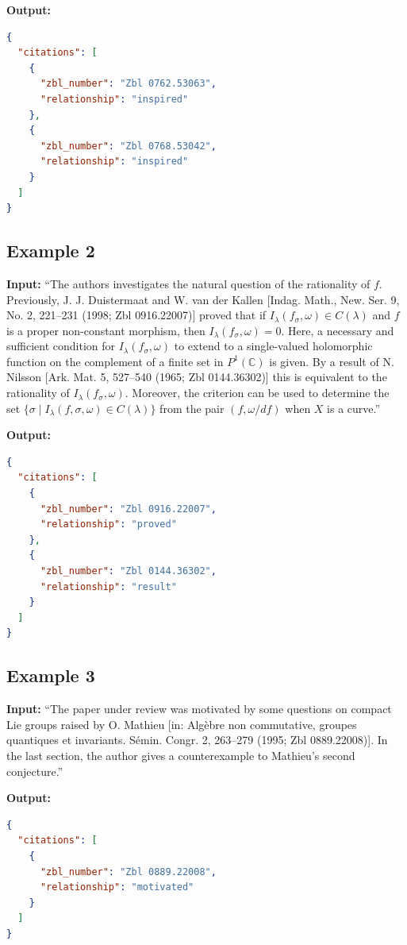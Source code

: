 \documentclass[sigconf,anonymous]{acmart}
\begin{document}
\textbf{Output:}
\begin{lstlisting}[language=json]
{
  "citations": [
    {
      "zbl_number": "Zbl 0762.53063",
      "relationship": "inspired"
    },
    {
      "zbl_number": "Zbl 0768.53042",
      "relationship": "inspired"
    }
  ]
}
\end{lstlisting}

\subsection*{Example 2}

\textbf{Input:} ``The authors investigates the natural question of the rationality of $f$. Previously, J. J. Duistermaat and W. van der Kallen [Indag. Math., New. Ser. 9, No. 2, 221–231 (1998; Zbl 0916.22007)] proved that if $I_\lambda(f_\sigma,\omega)\in C(\lambda)$ and $f$ is a proper non-constant morphism, then $I_\lambda(f_\sigma,\omega)=0$. Here, a necessary and sufficient condition for $I_\lambda(f_\sigma,\omega)$ to extend to a single-valued holomorphic function on the complement of a finite set in $P^1(\mathbb{C})$ is given. By a result of N. Nilsson [Ark. Mat. 5, 527–540 (1965; Zbl 0144.36302)] this is equivalent to the rationality of $I_\lambda(f_\sigma,\omega)$. Moreover, the criterion can be used to determine the set $\{\sigma\mid I_\lambda(f,\sigma,\omega)\in C(\lambda)\}$ from the pair $(f,\omega/df)$ when $X$ is a curve.''

\textbf{Output:}
\begin{lstlisting}[language=json]
{
  "citations": [
    {
      "zbl_number": "Zbl 0916.22007",
      "relationship": "proved"
    },
    {
      "zbl_number": "Zbl 0144.36302",
      "relationship": "result"
    }
  ]
}
\end{lstlisting}

\subsection*{Example 3}

\textbf{Input:} ``The paper under review was motivated by some questions on compact Lie groups raised by O. Mathieu [in: Algèbre non commutative, groupes quantiques et invariants. Sémin. Congr. 2, 263–279 (1995; Zbl 0889.22008)]. In the last section, the author gives a counterexample to Mathieu's second conjecture.''

\textbf{Output:}
\begin{lstlisting}[language=json]
{
  "citations": [
    {
      "zbl_number": "Zbl 0889.22008",
      "relationship": "motivated"
    }
  ]
}
\end{lstlisting}
\end{document}
